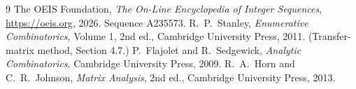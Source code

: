 \documentclass[11pt,a4paper]{article}
\theoremstyle{plain}
\theoremstyle{definition}
\begin{document}
\begin{thebibliography}{9}
 The OEIS Foundation, \emph{The On-Line Encyclopedia of Integer
Sequences}, \url{https://oeis.org}, 2026. Sequence A235573.
 R.~P.~Stanley, \emph{Enumerative Combinatorics}, Volume 1, 2nd ed.,
Cambridge University Press, 2011. (Transfer-matrix method, Section 4.7.)
 P.~Flajolet and R.~Sedgewick, \emph{Analytic Combinatorics}, Cambridge
University Press, 2009.
 R.~A.~Horn and C.~R.~Johnson, \emph{Matrix Analysis}, 2nd ed., Cambridge
University Press, 2013.
\end{thebibliography}
\end{document}

